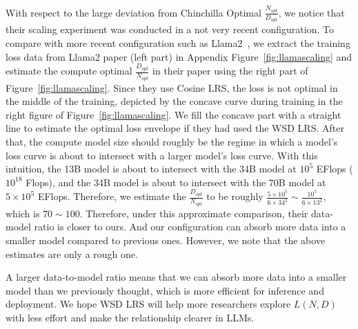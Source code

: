 With respect to the large deviation from Chinchilla Optimal $\frac{N_{opt}}{D_{opt}}$, we notice that their scaling experiment was conducted in a not very recent configuration. To compare with more recent configuration such as Llama2~\citep{touvron2023llama}, we extract the training loss data from Llama2 paper (left part) in Appendix Figure~\ref{fig:llamascaling} and estimate the compute optimal $\frac{D_{opt}}{N_{opt}}$ in their paper using the right part of Figure~\ref{fig:llamascaling}. Since they use Cosine LRS, the loss is not optimal in the middle of the training, depicted by the concave curve during training in the right figure of Figure~\ref{fig:llamascaling}. We fill the concave part with a straight line to estimate the optimal loss envelope if they had used the WSD LRS. After that, the compute model size should roughly be the regime in which a model's loss curve is about to intersect with a larger model's loss curve. With this intuition, the 13B model is about to intersect with the 34B model at $10^5$ EFlops ($10^18$ Flops), and the 34B model is about to intersect with the 70B model at $5\times 10^5$ EFlops. Therefore, we estimate the $\frac{D_{opt}}{N_{opt}}$ to be roughly $\frac{5\times 10^5}{6\times 34^2} \sim \frac{10^5}{6\times 13^2} $, which is $70 \sim 100$. Therefore, under this approximate comparison, their data-model ratio is closer to ours. And our configuration can absorb more data into a smaller model compared to previous ones. However, we note that the above estimates are only a rough one. 

A larger data-to-model ratio means that we can absorb more data into a smaller model than we previously thought, which is more efficient for inference and deployment. We hope WSD LRS will help more researchers explore $L(N, D)$ with less effort and make the relationship clearer in LLMs.  





